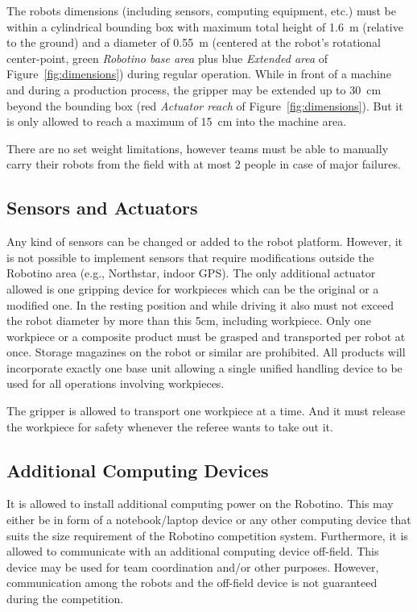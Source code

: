 \documentclass[12pt,twoside]{article}
\newcommand{\Robotino}{Robotino}
\newcommand{\reffig}[1]{Figure~\ref{#1}}
\begin{document}
The robots dimensions (including sensors, computing equipment, etc.) must be
within a cylindrical bounding box with maximum total height of \SI{1.6}{\metre}
(relative to the ground) and a diameter of
\SI{0.55}{\metre} (centered at the robot's rotational
center-point, green \emph{Robotino base area} plus blue \emph{Extended area} of
\reffig{fig:dimensions}) during regular operation.
While  in front of a machine and during a production process, the gripper may
be extended up to \SI{30}{\centi\metre} beyond the bounding box
(red \emph{Actuator reach} of \reffig{fig:dimensions}).
But it is only allowed to reach a maximum of
\SI{15}{\centi\metre} into the machine area.

There are no set weight limitations, however teams must be able to manually
carry their robots from the field with at most 2 people in case of major
failures.

\subsection{Sensors and Actuators}
Any kind of sensors can be changed or added to the robot platform.
However, it is not possible to implement sensors that require
modifications outside the Robotino area (e.g., Northstar, indoor GPS).
The only additional actuator allowed is one gripping device for
workpieces which can be the original or a modified one. In the resting
position and while driving it also must not exceed the robot diameter by
more than this 5cm, including workpiece.
Only one workpiece or a composite product must be grasped and
transported per robot at once. Storage magazines on the robot or
similar are prohibited. All products will incorporate exactly one base
unit allowing a single unified handling device to be used for all
operations involving workpieces.

The gripper is allowed to transport one workpiece at a time. And it must
release the workpiece for safety whenever the referee wants to take out it.

\subsection{Additional Computing Devices}
It is allowed to install additional computing power on the
\Robotino. This may either be in form of a notebook/laptop device or
any other computing device that suits the size requirement of the
\Robotino{} competition system. Furthermore, it is allowed to
communicate with an additional computing device off-field. This device
may be used for team coordination and/or other purposes. However,
communication among the robots and the off-field device is not
guaranteed during the competition.
\end{document}
